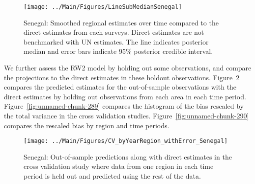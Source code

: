 \documentclass[12pt]{article}\usepackage[]{graphicx}\usepackage[]{color}
\newenvironment{knitrout}{}{} %
\begin{document}
\begin{knitrout}
\color{fgcolor}\begin{figure}[bht]

{\centering \texttt{[image: ../Main/Figures/LineSubMedianSenegal]} 

}

\caption[Senegal]{Senegal: Smoothed regional estimates over time compared to the direct estimates from each surveys. Direct estimates are not benchmarked with UN estimates. The line indicates posterior median and error bars indicate 95\% posterior credible interval.}\label{fig:unnamed-chunk-287}
\end{figure}


\end{knitrout}
We further assess the RW2 model by holding out some observations, and compare the projections to the direct estimates in these holdout observations. Figure~\ref{fig:unnamed-chunk-288} compares the predicted estimates for the out-of-sample observations  with the direct estimates by holding out observations from each area in each time period.  Figure~\ref{fig:unnamed-chunk-289} compares the histogram of the bias rescaled by the total variance in the cross validation studies. Figure~\ref{fig:unnamed-chunk-290} compares the rescaled bias by region and time periods.



 
\begin{knitrout}
\color{fgcolor}\begin{figure}[bht]

{\centering \texttt{[image: ../Main/Figures/CV\_byYearRegion\_withError\_Senegal]} 

}

\caption[Senegal]{Senegal: Out-of-sample predictions along with direct estimates in the cross validation study where data from one region in each time period is held out and predicted using the rest of the data.}\label{fig:unnamed-chunk-288}
\end{figure}


\end{knitrout}
\end{document}
